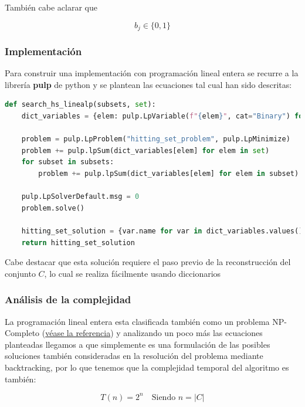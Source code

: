 También cabe aclarar que 

$$
b_j \in \{0, 1\}
$$

\subsubsection{Implementación}

Para construir una implementación con programación lineal entera se recurre a la librería \textbf{pulp} de python y se plantean las ecuaciones tal cual han sido descritas: 

\begin{lstlisting}[language=Python, caption= solución por programación líneal, label=python_code]
def search_hs_linealp(subsets, set):
    dict_variables = {elem: pulp.LpVariable(f"{elem}", cat="Binary") for elem in set}

    problem = pulp.LpProblem("hitting_set_problem", pulp.LpMinimize)
    problem += pulp.lpSum(dict_variables[elem] for elem in set)
    for subset in subsets:
        problem += pulp.lpSum(dict_variables[elem] for elem in subset) >= 1
    
    pulp.LpSolverDefault.msg = 0
    problem.solve()
    
    hitting_set_solution = {var.name for var in dict_variables.values() if pulp.value(var) == 1}
    return hitting_set_solution

\end{lstlisting}

Cabe destacar que esta solución requiere el paso previo de la reconstrucción del conjunto $C$, lo cual se realiza fácilmente usando diccionarios 

\subsubsection{Análisis de la complejidad}

La programación lineal entera esta clasificada también como un problema NP-Completo (\href{https://en.wikipedia.org/wiki/Integer_programming}{véase la referencia}) y analizando un poco más las ecuaciones planteadas llegamos a que simplemente es una formulación de las posibles soluciones también consideradas en la resolución del problema mediante backtracking, por lo que tenemos que la complejidad temporal del algoritmo es también: 

\begin{samepage}
\[
T(n) = 2^n \quad \text{Siendo } n = |C|
\]
\end{samepage}

